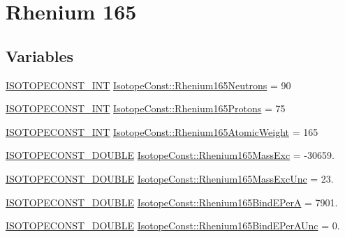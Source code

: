 \hypertarget{group___isotope_const-_rhenium-_re165}{}\section{Rhenium 165}
\label{group___isotope_const-_rhenium-_re165}
\subsection*{Variables}
\begin{DoxyCompactItemize}
\item 
\mbox{\hyperlink{group___isotope_const-_macros_ga5f18360b3e99483a35c32d789e62621c}{I\+S\+O\+T\+O\+P\+E\+C\+O\+N\+S\+T\+\_\+\+I\+NT}} \mbox{\hyperlink{group___isotope_const-_rhenium-_re165_ga3667687eb52f6a4777682cb464996914}{Isotope\+Const\+::\+Rhenium165\+Neutrons}} = 90
\item 
\mbox{\hyperlink{group___isotope_const-_macros_ga5f18360b3e99483a35c32d789e62621c}{I\+S\+O\+T\+O\+P\+E\+C\+O\+N\+S\+T\+\_\+\+I\+NT}} \mbox{\hyperlink{group___isotope_const-_rhenium-_re165_ga4cbc5d21470c457f10f85dc8143631bb}{Isotope\+Const\+::\+Rhenium165\+Protons}} = 75
\item 
\mbox{\hyperlink{group___isotope_const-_macros_ga5f18360b3e99483a35c32d789e62621c}{I\+S\+O\+T\+O\+P\+E\+C\+O\+N\+S\+T\+\_\+\+I\+NT}} \mbox{\hyperlink{group___isotope_const-_rhenium-_re165_ga7458d3dcf9c9b1cd4246d9709ef34410}{Isotope\+Const\+::\+Rhenium165\+Atomic\+Weight}} = 165
\item 
\mbox{\hyperlink{group___isotope_const-_macros_ga8f45a7272ce02c0b4c65c44636ed719a}{I\+S\+O\+T\+O\+P\+E\+C\+O\+N\+S\+T\+\_\+\+D\+O\+U\+B\+LE}} \mbox{\hyperlink{group___isotope_const-_rhenium-_re165_ga494d75cae9ff72aec58cdf4cf4d76513}{Isotope\+Const\+::\+Rhenium165\+Mass\+Exc}} = -\/30659.
\item 
\mbox{\hyperlink{group___isotope_const-_macros_ga8f45a7272ce02c0b4c65c44636ed719a}{I\+S\+O\+T\+O\+P\+E\+C\+O\+N\+S\+T\+\_\+\+D\+O\+U\+B\+LE}} \mbox{\hyperlink{group___isotope_const-_rhenium-_re165_gad682c492a3e6275799454bf568748ca3}{Isotope\+Const\+::\+Rhenium165\+Mass\+Exc\+Unc}} = 23.
\item 
\mbox{\hyperlink{group___isotope_const-_macros_ga8f45a7272ce02c0b4c65c44636ed719a}{I\+S\+O\+T\+O\+P\+E\+C\+O\+N\+S\+T\+\_\+\+D\+O\+U\+B\+LE}} \mbox{\hyperlink{group___isotope_const-_rhenium-_re165_ga186c0aa79286df2696c1840f5c5e915f}{Isotope\+Const\+::\+Rhenium165\+Bind\+E\+PerA}} = 7901.
\item 
\mbox{\hyperlink{group___isotope_const-_macros_ga8f45a7272ce02c0b4c65c44636ed719a}{I\+S\+O\+T\+O\+P\+E\+C\+O\+N\+S\+T\+\_\+\+D\+O\+U\+B\+LE}} \mbox{\hyperlink{group___isotope_const-_rhenium-_re165_gacf67c4a45bcfc60ccaf2c7092fe2ad42}{Isotope\+Const\+::\+Rhenium165\+Bind\+E\+Per\+A\+Unc}} = 0.

\end{DoxyCompactItemize}
